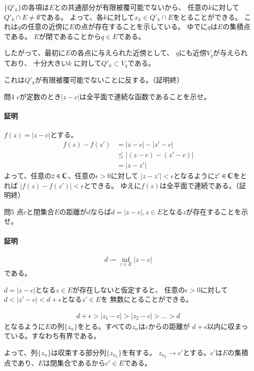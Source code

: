 $\{Q'_k\}$の各項は$E$との共通部分が有限被覆可能でないから、
任意の$k$に対して$Q'_k\cap E\neq\emptyset$である。
よって、各$k$に対して$x_k\in Q'_k\cap E$をとることができる。
これは$q$の任意の近傍に$E$の点が存在することを示している。
ゆでに$q$は$E$の集積点である。
$E$が閉であることから$q\in E$である。

したがって、最初に$E$の各点に与えられた近傍として、
$q$にも近傍$V_q$が与えられており、
十分大きい$k$ に対して$Q'_k\subset V_q$である。

これは$Q'_k$が有限被覆可能でないことに反する。（証明終）

\begin{mysimplebox}{問4}
    $c$が定数のとき$|z-c|$は全平面で連続な函数であることを示せ。
\end{mysimplebox}
\paragraph{証明}
$f(z)=|z-c|$とする。
\begin{align*}
    f(z)-f(z')&=|z-c|-|z'-c|\\
    &\le |(z-c)-(z'-c)|\\
    &=|z-z'|
\end{align*}
よって、任意の$z\in\mathbb{C}$、任意の$\epsilon>0$に対して
$|z-z'|<\epsilon$となるように$z'\in\mathbb{C}$をとれば
$|f(z)-f(z')|<\epsilon$とできる。
ゆえに$f(z)$は全平面で連続である。（証明終）

\begin{mysimplebox}{問5}
    点$c$と閉集合$E$の距離が$d$ならば$d=|z-c|, z\in E$となる$z$が存在することを示せ。
\end{mysimplebox}
\paragraph{証明}
\begin{align*}
    d\coloneqq \inf_{z\in E}|z-c|
\end{align*}
である。

$d=|z-c|$となる$z\in E$が存在しないと仮定すると、
任意の$\epsilon>0$に対して$d<|z'-c|<d+\epsilon$となる$z'\in E$を
無数にとることができる。

\begin{align*}
    d+\epsilon>|z_1-c|>|z_2-c|>\dots>d
\end{align*}
となるように$E$の列$\{z_n\}$をとる。すべての$z_n$は$c$からの距離が
$d+\epsilon$以内に収まっている。すなわち有界である。

よって、列$\{z_n\}$は収束する部分列$\{z_{n_k}\}$を有する。
$z_{n_k}\longrightarrow c'$とする。$c'$は$E$の集積点であり、$E$は閉集合であるから$c'\in E$である。

